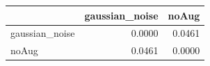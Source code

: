 \begin{tabular}{lrr}
\toprule
 & gaussian_noise & noAug \\
\midrule
gaussian_noise & 0.0000 & 0.0461 \\
noAug & 0.0461 & 0.0000 \\
\bottomrule
\end{tabular}
